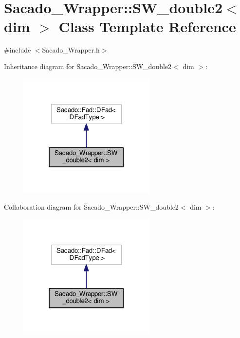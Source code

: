 \hypertarget{classSacado__Wrapper_1_1SW__double2}{}\section{Sacado\+\_\+\+Wrapper\+:\+:S\+W\+\_\+double2$<$ dim $>$ Class Template Reference}
\label{classSacado__Wrapper_1_1SW__double2}


{\ttfamily \#include $<$Sacado\+\_\+\+Wrapper.\+h$>$}



Inheritance diagram for Sacado\+\_\+\+Wrapper\+:\+:S\+W\+\_\+double2$<$ dim $>$\+:
\nopagebreak
\begin{figure}[H]
\begin{center}
\leavevmode
\includegraphics[width=194pt]{classSacado__Wrapper_1_1SW__double2__inherit__graph}
\end{center}
\end{figure}


Collaboration diagram for Sacado\+\_\+\+Wrapper\+:\+:S\+W\+\_\+double2$<$ dim $>$\+:
\nopagebreak
\begin{figure}[H]
\begin{center}
\leavevmode
\includegraphics[width=194pt]{classSacado__Wrapper_1_1SW__double2__coll__graph}
\end{center}
\end{figure}
